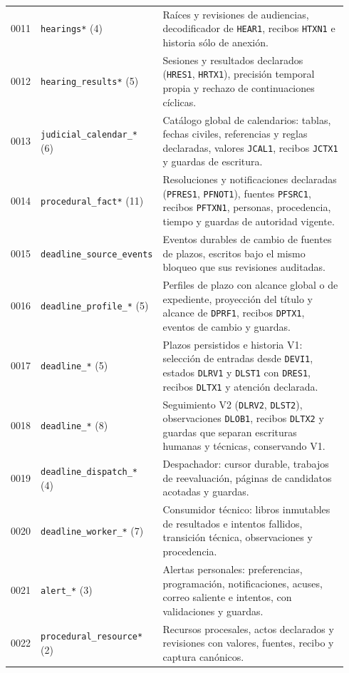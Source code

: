 \begin{longtable}{@{}C{0.06\linewidth}L{0.29\linewidth}L{0.59\linewidth}@{}}
  0011 & \texttt{hearings*} (4) & Raíces y revisiones de audiencias, decodificador de \texttt{HEAR1}, recibos \texttt{HTXN1} e historia sólo de anexión. \\
  0012 & \texttt{hearing\_results*} (5) & Sesiones y resultados declarados (\texttt{HRES1}, \texttt{HRTX1}), precisión temporal propia y rechazo de continuaciones cíclicas. \\
  0013 & \texttt{judicial\_calendar\_*} (6) & Catálogo global de calendarios: tablas, fechas civiles, referencias y reglas declaradas, valores \texttt{JCAL1}, recibos \texttt{JCTX1} y guardas de escritura. \\
  0014 & \texttt{procedural\_fact*} (11) & Resoluciones y notificaciones declaradas (\texttt{PFRES1}, \texttt{PFNOT1}), fuentes \texttt{PFSRC1}, recibos \texttt{PFTXN1}, personas, procedencia, tiempo y guardas de autoridad vigente. \\
  0015 & \texttt{deadline\_source\_events} & Eventos durables de cambio de fuentes de plazos, escritos bajo el mismo bloqueo que sus revisiones auditadas. \\
  0016 & \texttt{deadline\_profile\_*} (5) & Perfiles de plazo con alcance global o de expediente, proyección del título y alcance de \texttt{DPRF1}, recibos \texttt{DPTX1}, eventos de cambio y guardas. \\
  0017 & \texttt{deadline\_*} (5) & Plazos persistidos e historia V1: selección de entradas desde \texttt{DEVI1}, estados \texttt{DLRV1} y \texttt{DLST1} con \texttt{DRES1}, recibos \texttt{DLTX1} y atención declarada. \\
  0018 & \texttt{deadline\_*} (8) & Seguimiento V2 (\texttt{DLRV2}, \texttt{DLST2}), observaciones \texttt{DLOB1}, recibos \texttt{DLTX2} y guardas que separan escrituras humanas y técnicas, conservando V1. \\
  0019 & \texttt{deadline\_dispatch\_*} (4) & Despachador: cursor durable, trabajos de reevaluación, páginas de candidatos acotadas y guardas. \\
  0020 & \texttt{deadline\_worker\_*} (7) & Consumidor técnico: libros inmutables de resultados e intentos fallidos, transición técnica, observaciones y procedencia. \\
  0021 & \texttt{alert\_*} (3) & Alertas personales: preferencias, programación, notificaciones, acuses, correo saliente e intentos, con validaciones y guardas. \\
  0022 & \texttt{procedural\_resource*} (2) & Recursos procesales, actos declarados y revisiones con valores, fuentes, recibo y captura canónicos. \\

\end{longtable}
